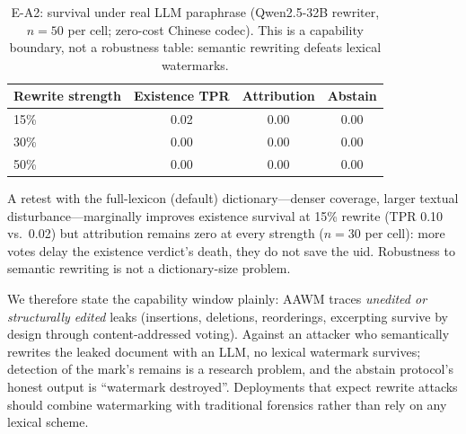 \begin{table}[t]
\centering\small
\caption{E-A2: survival under real LLM paraphrase (Qwen2.5-32B rewriter,
$n{=}50$ per cell; zero-cost Chinese codec). This is a capability boundary,
not a robustness table: semantic rewriting defeats lexical watermarks.}
\label{tab:ea2}
\begin{tabular}{@{}lccc@{}}
\toprule
Rewrite strength & Existence TPR & Attribution & Abstain \\
\midrule
15\% & 0.02 & 0.00 & 0.00 \\
30\% & 0.00 & 0.00 & 0.00 \\
50\% & 0.00 & 0.00 & 0.00 \\
\bottomrule
\end{tabular}
\end{table}

A retest with the full-lexicon (default) dictionary---denser coverage,
larger textual disturbance---marginally improves existence survival at
15\% rewrite (TPR 0.10 vs.\ 0.02) but attribution remains zero at every
strength ($n{=}30$ per cell): more votes delay the existence verdict's
death, they do not save the uid. Robustness to semantic rewriting is not a
dictionary-size problem.

We therefore state the capability window plainly: AAWM traces
\emph{unedited or structurally edited} leaks (insertions, deletions,
reorderings, excerpting survive by design through content-addressed
voting). Against an attacker who semantically rewrites the leaked document
with an LLM, no lexical watermark survives; detection of the mark's
remains is a research problem, and the abstain protocol's honest output is
``watermark destroyed''. Deployments that expect rewrite attacks should
combine watermarking with traditional forensics rather than rely on any
lexical scheme.
